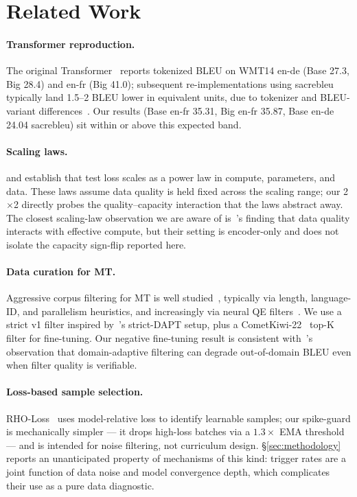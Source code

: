 \section{Related Work}
\label{sec:related}

\paragraph{Transformer reproduction.}
The original Transformer~\cite{vaswani2017attention} reports tokenized BLEU on WMT14 en-de (Base 27.3, Big 28.4) and en-fr (Big 41.0); subsequent re-implementations using sacrebleu~\cite{post2018call} typically land 1.5--2 BLEU lower in equivalent units, due to tokenizer and BLEU-variant differences~\cite{post2018call}. Our results (Base en-fr 35.31, Big en-fr 35.87, Base en-de 24.04 sacrebleu) sit within or above this expected band.

\paragraph{Scaling laws.}
\cite{kaplan2020scaling} and \cite{hoffmann2022chinchilla} establish that test loss scales as a power law in compute, parameters, and data. These laws assume data quality is held fixed across the scaling range; our 2$\times$2 directly probes the quality--capacity interaction that the laws abstract away. The closest scaling-law observation we are aware of is~\cite{tay2022scaling}'s finding that data quality interacts with effective compute, but their setting is encoder-only and does not isolate the capacity sign-flip reported here.

\paragraph{Data curation for MT.}
Aggressive corpus filtering for MT is well studied~\cite{koehn2018findings, junczys2019cscope}, typically via length, language-ID, and parallelism heuristics, and increasingly via neural QE filters~\cite{batheja2022qe}. We use a strict v1 filter inspired by~\cite{gururangan2020dont}'s strict-DAPT setup, plus a CometKiwi-22~\cite{rei2022cometkiwi} top-K filter for fine-tuning. Our negative fine-tuning result is consistent with~\cite{junczys2019cscope}'s observation that domain-adaptive filtering can degrade out-of-domain BLEU even when filter quality is verifiable.

\paragraph{Loss-based sample selection.}
RHO-Loss~\cite{mindermann2022prioritized} uses model-relative loss to identify learnable samples; our spike-guard is mechanically simpler --- it drops high-loss batches via a $1.3\times$ EMA threshold --- and is intended for noise filtering, not curriculum design. \S\ref{sec:methodology} reports an unanticipated property of mechanisms of this kind: trigger rates are a joint function of data noise and model convergence depth, which complicates their use as a pure data diagnostic.
